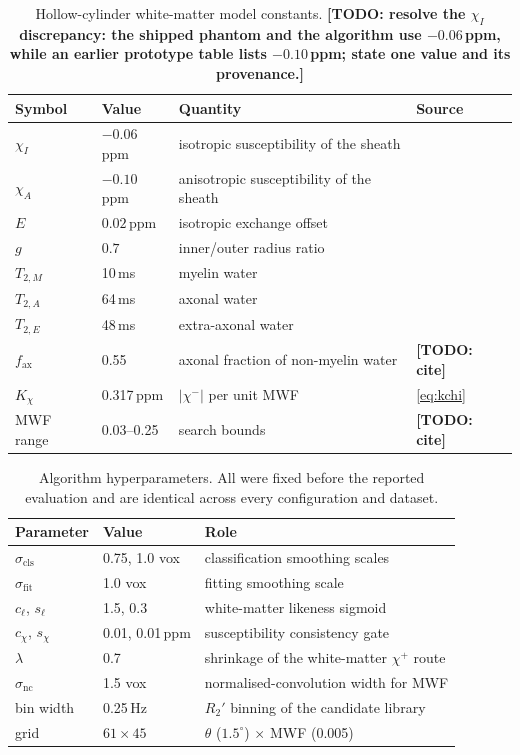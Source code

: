 \documentclass[AMA,STIX2COL,Linenumberson]{MRM}
\newcommand{\TODO}[1]{{\color{red}\textbf{[TODO: #1]}}}
\newcommand{\TODO}[1]{}
\begin{document}
\begin{table}[t]
\caption{Hollow-cylinder white-matter model constants. \TODO{resolve the $\chi_I$ discrepancy: the shipped phantom and the algorithm use $-0.06$\,ppm, while an earlier prototype table lists $-0.10$\,ppm; state one value and its provenance.}}
\label{tab:params}
\centering
\begin{tabular}{llll}
\hline
Symbol & Value & Quantity & Source \\
\hline
$\chi_I$ & $-0.06$\,ppm & isotropic susceptibility of the sheath & \cite{wharton_fiber_2012} \\
$\chi_A$ & $-0.10$\,ppm & anisotropic susceptibility of the sheath & \cite{wharton_fiber_2012} \\
$E$ & $0.02$\,ppm & isotropic exchange offset & \cite{wharton_fiber_2012} \\
$g$ & $0.7$ & inner/outer radius ratio & \cite{wharton_fiber_2012} \\
$T_{2,M}$ & 10\,ms & myelin water & \cite{wharton_fiber_2012} \\
$T_{2,A}$ & 64\,ms & axonal water & \cite{wharton_fiber_2012} \\
$T_{2,E}$ & 48\,ms & extra-axonal water & \cite{wharton_fiber_2012} \\
$f_{\mathrm{ax}}$ & 0.55 & axonal fraction of non-myelin water & \TODO{cite} \\
$K_\chi$ & 0.317\,ppm & $|\chi^{-}|$ per unit MWF & \eqref{eq:kchi} \\
MWF range & 0.03--0.25 & search bounds & \TODO{cite} \\
\hline
\end{tabular}
\end{table}

\begin{table}[t]
\caption{Algorithm hyperparameters. All were fixed before the reported evaluation and are identical across every configuration and dataset.}
\label{tab:hyper}
\centering
\begin{tabular}{lll}
\hline
Parameter & Value & Role \\
\hline
$\sigma_{\mathrm{cls}}$ & 0.75, 1.0 vox & classification smoothing scales \\
$\sigma_{\mathrm{fit}}$ & 1.0 vox & fitting smoothing scale \\
$c_\ell$, $s_\ell$ & 1.5, 0.3 & white-matter likeness sigmoid \\
$c_\chi$, $s_\chi$ & 0.01, 0.01\,ppm & susceptibility consistency gate \\
$\lambda$ & 0.7 & shrinkage of the white-matter $\chi^{+}$ route \\
$\sigma_{\mathrm{nc}}$ & 1.5 vox & normalised-convolution width for MWF \\
bin width & 0.25\,Hz & $R_2'$ binning of the candidate library \\
grid & $61\times45$ & $\theta$ ($1.5^\circ$) $\times$ MWF (0.005) \\
\hline
\end{tabular}
\end{table}
\end{document}
